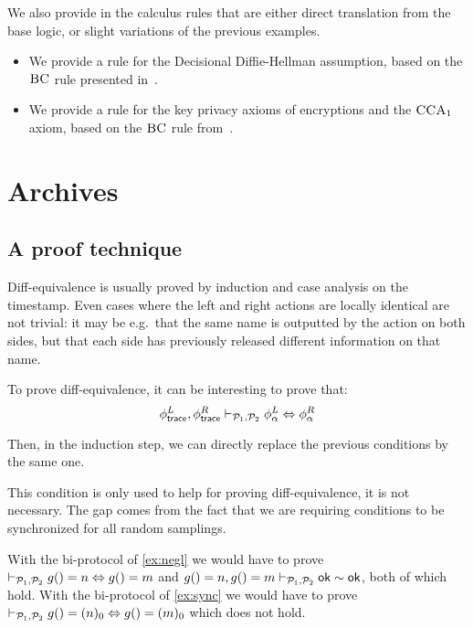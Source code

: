 We also provide in the calculus rules that are either direct translation from the base logic, or slight variations of the previous examples.
\begin{itemize}
\item We provide a rule for the Decisional Diffie-Hellman assumption, based on the $\textsc{BC}$ rule presented in~\cite{bana2019verification}.
\item We provide a rule for the key privacy axioms of encryptions and the $\textsc{CCA}_1$ axiom, based on the $\textsc{BC}$ rule from~\cite{Bana:2014:CCS:2660267.2660276}.

\end{itemize}


\clearpage
\section{Archives}
\subsection{A proof technique}

Diff-equivalence is usually proved by induction and case analysis on
the timestamp. Even cases where the left and right actions are locally
identical are not trivial: it may be e.g.\ that the same name is outputted
by the action on both sides, but that each side has previously released
different information on that name.

To prove diff-equivalence, it can be interesting to prove that:
\[
  \phi^L_{\textsf{trace}}, \phi^R_{\textsf{trace}}
  \vdash_{\mathcal{P}_1,\mathcal{P}_2}
  \phi^L_\alpha \Leftrightarrow \phi^R_\alpha
\]

Then, in the induction step, we can directly replace the previous conditions by the same one.


This condition is only used to help for proving diff-equivalence, it is not necessary.
The gap comes from the fact that we are requiring conditions to be
synchronized for all random samplings.

\begin{example}
  With the bi-protocol of \cref{ex:negl} we would have to prove
  $\vdash_{\mathcal{P}_1,\mathcal{P}_2} g() = n \Leftrightarrow g() = m$ and
  $g()=n, g()=m \vdash_{\mathcal{P}_1,\mathcal{P}_2} \mathsf{ok} \sim \mathsf{ok}$, both of which hold.
  With the bi-protocol of \cref{ex:sync} we would have to prove
  $\vdash_{\mathcal{P}_1,\mathcal{P}_2} g() = (n)_0 \Leftrightarrow g() = (m)_0$ which does not hold.
\end{example}

